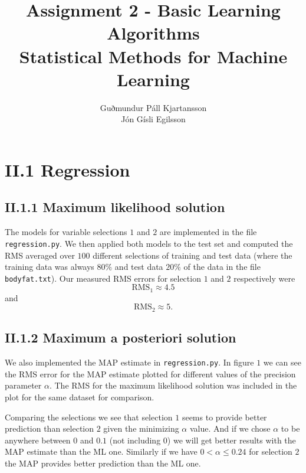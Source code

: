 \documentclass[a4paper,10pt]{article}
\title{
	Assignment 2 - Basic Learning Algorithms	\\
	Statistical Methods for Machine Learning
  }
\author{
	Guðmundur Páll Kjartansson \\
	Jón Gísli Egilsson
}
\begin{document}
\maketitle

\section*{II.1 Regression}

\subsection*{II.1.1 Maximum likelihood solution}

The models for variable selections $1$ and $2$ are implemented in the file \verb=regression.py=. We then applied both models to the test set and computed the RMS averaged over $100$ different selections of training and test data (where the training data was always $80\%$ and test data $20\%$ of the data in the file \verb=bodyfat.txt=). Our measured RMS errors for selection $1$ and $2$ respectively were
$$\text{RMS}_1 \approx 4.5$$
and
$$\text{RMS}_2 \approx 5.$$

\subsection*{II.1.2 Maximum a posteriori solution}

We also implemented the MAP estimate in \verb=regression.py=. In figure $1$ we can see the RMS error for the MAP estimate plotted for different values of the precision parameter $\alpha$. The RMS for the maximum likelihood solution was included in the plot for the same dataset for comparison.

Comparing the selections we see that selection $1$ seems to provide better prediction than selection $2$ given the minimizing $\alpha$ value. And if we chose $\alpha$ to be anywhere between $0$ and $0.1$ (not including $0$) we will get better results with the MAP estimate than the ML one. Similarly if we have $0 < \alpha \leq 0.24$ for selection $2$ the MAP provides better prediction than the ML one.
\end{document}
